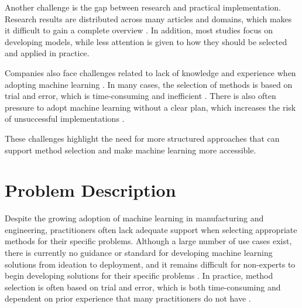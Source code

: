 Another challenge is the gap between research 
and practical implementation. Research results are 
distributed across many articles and domains, 
which makes it difficult to gain a complete overview 
\parencite{adekoya2022applications_ai_em}. 
In addition, most studies focus on developing models, 
while less attention is given to how they should be selected 
and applied in practice.

Companies also face challenges related to lack of knowledge 
and experience when adopting machine learning 
\parencite{sonntag2023pattern_ml_product_development}. 
In many cases, the selection of methods is based on 
trial and error, which is time-consuming and inefficient 
\parencite{sonntag2023pattern_ml_product_development}. 
There is also often pressure to adopt machine learning 
without a clear plan, which increases the risk 
of unsuccessful implementations 
\parencite{plathottam2023review_ai_manufacturing}. 

These challenges highlight the need for more structured 
approaches that can support method selection 
and make machine learning more accessible.


\section{Problem Description}

Despite the growing adoption of machine learning in manufacturing 
and engineering, practitioners often lack adequate support when 
selecting appropriate methods for their specific problems. 
Although a large number of use cases exist, there is currently 
no guidance or standard for developing machine learning solutions 
from ideation to deployment, and it remains difficult for 
non-experts to begin developing solutions for their specific 
problems \parencite{chen2023ml_manufacturing_industry4}. 
In practice, method selection is often based on trial and error, 
which is both time-consuming and dependent on prior experience 
that many practitioners do not have 
\parencite{sonntag2023pattern_ml_product_development}.


